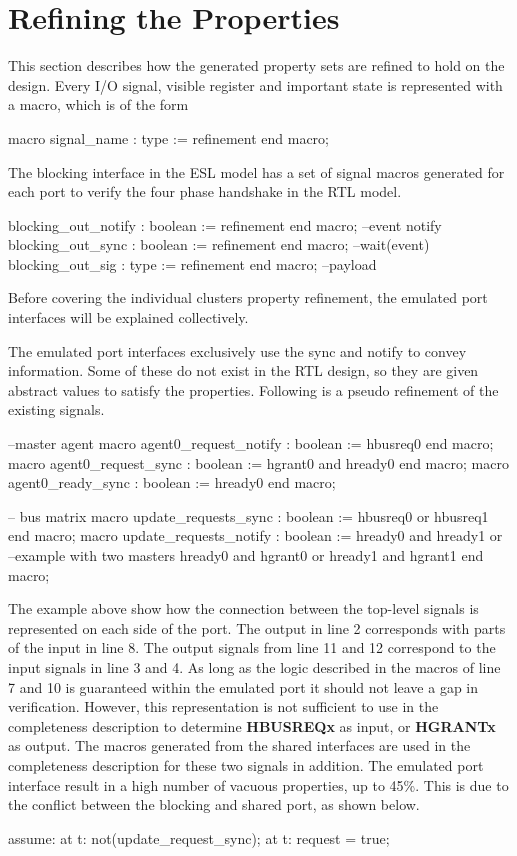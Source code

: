 \section{Refining the Properties}
\label{sec:refine}
This section describes how the generated property sets are refined to hold on the design. Every I/O signal, visible register and important state is represented with a macro, which is of the form 
\begin{VHI}
macro signal_name : type := refinement end macro;
\end{VHI}

The blocking interface in the ESL model has a set of signal macros generated for each port to verify the four phase handshake in the RTL model.
\begin{VHI}
blocking_out_notify : boolean := refinement end macro; --event notify
blocking_out_sync : boolean := refinement end macro;   --wait(event)
blocking_out_sig : type := refinement end macro;       --payload
\end{VHI}


Before covering the individual clusters property refinement, the emulated port interfaces will be explained collectively. \par
The emulated port interfaces exclusively use the sync and notify to convey information. Some of these do not exist in the RTL design, so they are given abstract values to satisfy the properties. Following is a pseudo refinement of the existing signals.
\begin{VHI}
--master agent
macro agent0_request_notify : boolean := hbusreq0 end macro;
macro agent0_request_sync : boolean := hgrant0 and hready0 end macro;
macro agent0_ready_sync : boolean := hready0 end macro;

-- bus matrix
macro update_requests_sync : boolean := 
 hbusreq0 or hbusreq1 
end macro;
macro update_requests_notify : boolean :=
 hready0 and hready1 or --example with two masters
 hready0 and hgrant0 or
 hready1 and hgrant1
end macro;
\end{VHI}

The example above show how the connection between the top-level signals is represented on each side of the port. The output in line 2 corresponds with parts of the input in line 8. The output signals from line 11 and 12 correspond to the input signals in line 3 and 4. As long as the logic described in the macros of line 7 and 10 is guaranteed within the emulated port it should not leave a gap in verification. However, this representation is not sufficient to use in the completeness description to determine \textbf{HBUSREQx} as input, or \textbf{HGRANTx} as output. The macros generated from the shared interfaces are used in the completeness description for these two signals in addition. The emulated port interface result in a high number of vacuous properties, up to 45\%. This is due to the conflict between the blocking and shared port, as shown below.
\begin{VHI}
assume:
 at t: not(update_request_sync);
 at t: request  = true;
\end{VHI}

